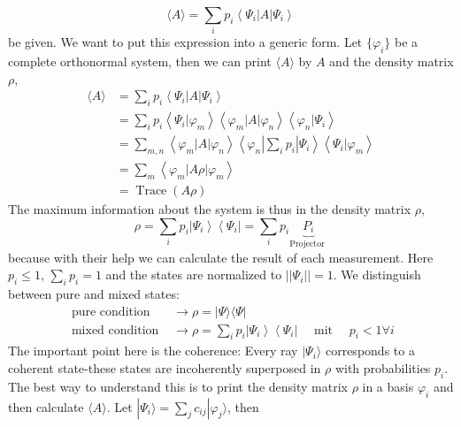 \begin{equation}
    \langle A\rangle=\sum_{i} p_{i}\left\langle\Psi_{i}|A| \Psi_{i}\right\rangle
    \end{equation}
be given. We want to put this expression into a generic form. Let $\{\varphi_i\}$ be a complete orthonormal system, then we can print $\langle A\rangle$ by $A$ and the density matrix $\rho$,
\begin{equation}
\begin{aligned}\langle A\rangle &=\sum_{i} p_{i}\left\langle\Psi_{i}|A| \Psi_{i}\right\rangle \\ &=\sum_{i} p_{i}\left\langle\Psi_{i} | \varphi_{m}\right\rangle\left\langle\varphi_{m}|A| \varphi_{n}\right\rangle\left\langle\varphi_{n} | \Psi_{i}\right\rangle \\ &=\sum_{m, n}\left\langle\varphi_{m}|A| \varphi_{n}\right\rangle\left\langle\varphi_{n}\left|\sum_{i} p_{i}\right| \Psi_{i}\right\rangle\left\langle\Psi_{i} | \varphi_{m}\right\rangle \\ &=\sum_{m}\left\langle\varphi_{m}|A \rho| \varphi_{m}\right\rangle \\ &=\operatorname{Trace}(A \rho) \end{aligned}
\end{equation}
The maximum information about the system is thus in the density matrix $\rho$,
\begin{equation}
    \rho=\sum_{i} p_{i}\left|\Psi_{i}\right\rangle\left\langle\Psi_{i}\right|=\sum_{i} p_{i} \underbrace{P_{i}}_{\text {Projector }}
    \end{equation}
because with their help we can calculate the result of each measurement. Here $p_i\leq 1$, $\sum_i p_i = 1$ and the states are normalized to $||\Psi_i||=1$. We distinguish between pure and mixed states:
\begin{equation}
\begin{aligned} \text { pure condition } & \rightarrow \rho=|\Psi\rangle\langle\Psi| \\ \text { mixed condition } & \rightarrow \rho=\sum_{i} p_{i}\left|\Psi_{i}\right\rangle\left\langle\Psi_{i}\right| \quad \text { mit } \quad p_{i}<1 \forall i \end{aligned}
\end{equation}
The important point here is the coherence: Every ray $|\Psi_i\rangle$ corresponds to a coherent state-these states are incoherently superposed in $\rho$ with probabilities $p_i$. The best way to understand this is to print the density matrix $\rho$ in a basis {$\varphi_i$} and then calculate $\langle A\rangle$. Let $|\Psi_i\rangle=\sum_j c_{ij}|\varphi_j\rangle$, then
